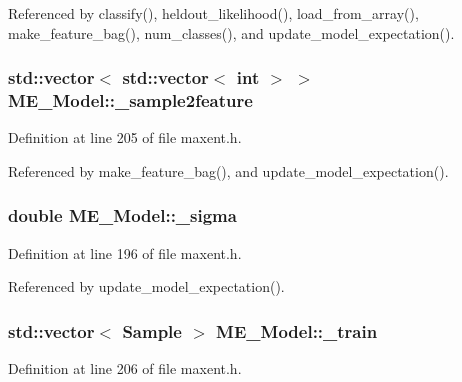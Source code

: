 Referenced by classify(), heldout\_\-likelihood(), load\_\-from\_\-array(), make\_\-feature\_\-bag(), num\_\-classes(), and update\_\-model\_\-expectation().\hypertarget{classME__Model_5d08a0ae3292a2fecf9473aee17660a8}{
\subsubsection[{\_\-sample2feature}]{\setlength{\rightskip}{0pt plus 5cm}std::vector$<$ std::vector$<$ int $>$ $>$ {\bf ME\_\-Model::\_\-sample2feature}}}
\label{classME__Model_5d08a0ae3292a2fecf9473aee17660a8}




Definition at line 205 of file maxent.h.

Referenced by make\_\-feature\_\-bag(), and update\_\-model\_\-expectation().\hypertarget{classME__Model_da41f84f6e6c25acec3698903f3a5cb3}{
\subsubsection[{\_\-sigma}]{\setlength{\rightskip}{0pt plus 5cm}double {\bf ME\_\-Model::\_\-sigma}}}
\label{classME__Model_da41f84f6e6c25acec3698903f3a5cb3}




Definition at line 196 of file maxent.h.

Referenced by update\_\-model\_\-expectation().\hypertarget{classME__Model_01bbc4b24d88cda6c77db3ef17f48f19}{
\subsubsection[{\_\-train}]{\setlength{\rightskip}{0pt plus 5cm}std::vector$<$ {\bf Sample} $>$ {\bf ME\_\-Model::\_\-train}}}
\label{classME__Model_01bbc4b24d88cda6c77db3ef17f48f19}




Definition at line 206 of file maxent.h.

